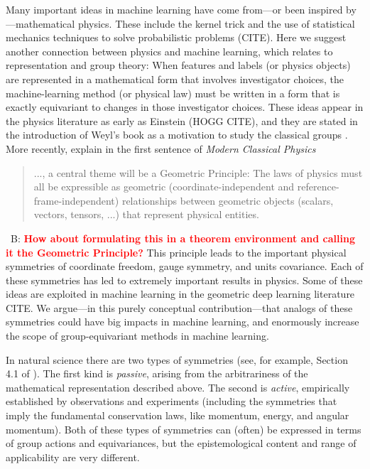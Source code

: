 \documentclass{article}
\theoremstyle{plain}
\theoremstyle{definition}
\theoremstyle{remark}
\newcommand{\bernhard}[1]{~B: \textcolor{red}{\textbf{#1}}}
\begin{document}
Many important ideas in machine learning have come from---or been inspired by---mathematical physics.
These include the kernel trick \cite{CouHil53,SchSmo02} and the use of statistical mechanics techniques to solve probabilistic problems (CITE).
Here we suggest another connection between physics and machine learning, which relates to representation and group theory:
When features and labels (or physics objects) are represented in a mathematical form that involves investigator choices, the machine-learning method (or physical law) must be written in a form that is exactly equivariant to changes in those investigator choices.
These ideas appear in the physics literature as early as Einstein (HOGG CITE), and they are stated in the introduction of Weyl's book as a motivation to study the classical groups \cite{weyl}. More recently, \citealt{mcp} explain in the first sentence of {\em Modern Classical Physics}  
\begin{quote}
..., a central theme will be a Geometric Principle: The laws of physics must all
be expressible as geometric (coordinate-independent and reference-frame-independent)
relationships between geometric objects (scalars, vectors, tensors, ...) that represent
physical entities.
\end{quote}
\bernhard{How about formulating this in a theorem environment and calling it the Geometric Principle?}
This principle leads to the important physical symmetries of coordinate freedom, gauge symmetry, and units covariance.
Each of these symmetries has led to extremely important results in physics. Some of these ideas are exploited in machine learning in the geometric deep learning literature CITE. 
We argue---in this purely conceptual contribution---that analogs of these symmetries could have big impacts in machine learning, and enormously increase the scope of group-equivariant methods in machine learning.

In natural science there are two types of symmetries (see, for example, Section 4.1 of \citealt{rovelli2000loop}). 
The first kind is \emph{passive}, arising from the arbitrariness of the mathematical representation described above.
The second is \emph{active}, empirically established by observations and experiments (including the symmetries that imply the fundamental conservation laws, like momentum, energy, and angular momentum).
Both of these types of symmetries can (often) be expressed in terms of group actions and equivariances, but the epistemological content and range of applicability are very different. 
\end{document}
